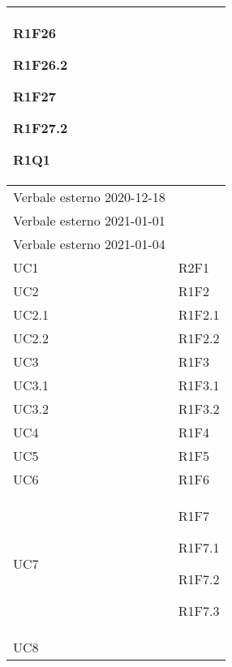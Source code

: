 \begin{center}
\begin{longtable}{|p{44mm}|p{22mm}|}
R1F26 \newline

R1F26.2 \newline

R1F27 \newline

R1F27.2 \newline

R1Q1 \newline
\\
\hline
Verbale esterno 2020-12-18 &
\\
\hline
Verbale esterno 2021-01-01 &
\\
\hline
Verbale esterno 2021-01-04 &
\\
\hline
UC1 &
R2F1 \newline
\\
\hline
UC2 &

R1F2 \newline
\\
\hline
UC2.1 &

R1F2.1 \newline
\\
\hline
UC2.2 &

R1F2.2 \newline
\\
\hline
UC3 &

R1F3 \newline
\\
\hline
UC3.1 &

R1F3.1 \newline
\\
\hline
UC3.2 &

R1F3.2 \newline
\\
\hline
UC4 &

R1F4 \newline
\\
\hline
UC5 &

R1F5 \newline
\\
\hline
UC6 &

R1F6 \newline
\\
\hline
UC7 &

R1F7 \newline

R1F7.1 \newline

R1F7.2 \newline

R1F7.3 \newline
\\
\hline
UC8 &


\end{longtable}
\end{center}
